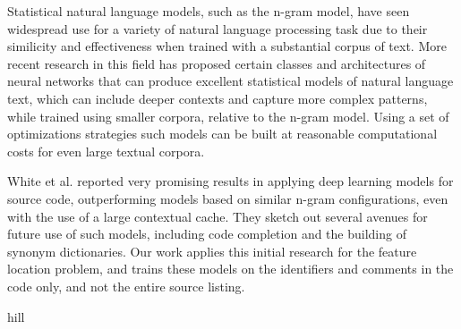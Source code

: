 


%
Statistical natural language models, such as the n-gram model, have
seen widespread use for a variety of natural language processing task
due to their similicity and effectiveness when trained with a
substantial corpus of text. More recent research in this field has
proposed certain classes and architectures of neural networks that can
produce excellent statistical models of natural language text, which
can include deeper contexts and capture more complex patterns, while
trained using smaller corpora, relative to the n-gram model. Using a
set of optimizations strategies such models can be built at reasonable
computational costs for even large textual corpora.



White et al. reported very promising results in applying deep learning
models for source code, outperforming models based on similar n-gram
configurations, even with the use of a large contextual cache. They
sketch out several avenues for future use of such models, including
code completion and the building of synonym dictionaries. Our work
applies this initial research for the feature location problem, and
trains these models on the identifiers and comments in the code only,
and not the entire source listing.






hill~\cite{hill_use_2014}
